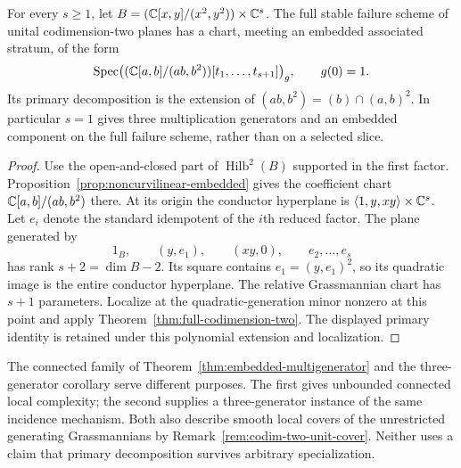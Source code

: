 \begin{corollary}
\label{cor:three-generator-embedded}
For every $s\ge1$, let
$B=(\mathbb C[x,y]/(x^2,y^2))\times\mathbb C^s$. The full stable failure scheme
of unital codimension-two planes has a chart, meeting an embedded
associated stratum, of the form
\[
 \operatorname{Spec}
 \bigl((\mathbb C[a,b]/(ab,b^2))[t_1,\ldots,t_{s+1}]\bigr)_g,
 \qquad g(0)=1.
\]
Its primary decomposition is the extension of
$(ab,b^2)=(b)\cap(a,b)^2$. In particular $s=1$ gives three
multiplication generators and an embedded component on the full
failure scheme, rather than on a selected slice.
\end{corollary}
\begin{proof}
Use the open-and-closed part of $\operatorname{Hilb}^2(B)$ supported
in the first factor. Proposition~\ref{prop:noncurvilinear-embedded}
gives the coefficient chart $\mathbb C[a,b]/(ab,b^2)$ there. At its origin
the conductor hyperplane is
$\langle1,y,xy\rangle\times\mathbb C^s$. Let $e_i$ denote the standard
idempotent of the $i$th reduced factor. The plane generated by
\[
 1_B,\qquad (y,e_1),\qquad (xy,0),\qquad e_2,\ldots,e_s
\]
has rank $s+2=\dim B-2$. Its square contains $e_1=(y,e_1)^2$,
so its quadratic image is the entire conductor hyperplane.
The relative Grassmannian chart has $s+1$ parameters. Localize at
the quadratic-generation minor nonzero at this point and apply
Theorem~\ref{thm:full-codimension-two}. The displayed primary
identity is retained under this polynomial extension and localization.
\end{proof}

The connected family of Theorem~\ref{thm:embedded-multigenerator}
and the three-generator corollary serve different purposes. The
first gives unbounded connected local complexity; the second supplies
a three-generator instance of the same incidence mechanism. Both
also describe smooth local covers of the unrestricted generating
Grassmannians by Remark~\ref{rem:codim-two-unit-cover}. Neither uses
a claim that primary decomposition survives arbitrary specialization.
